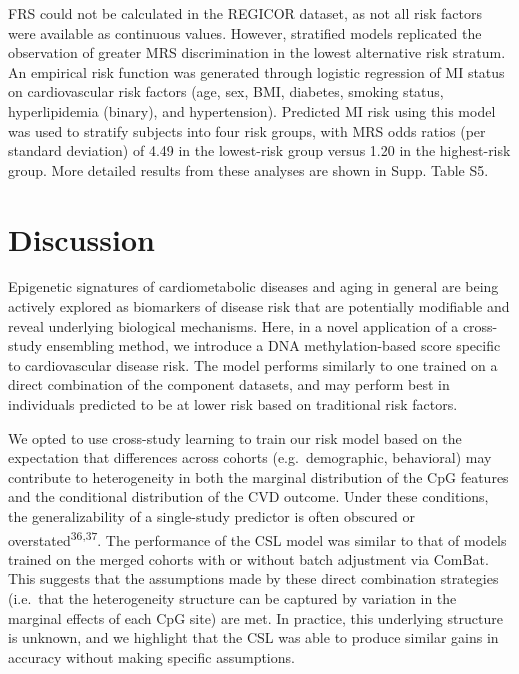 \documentclass[]{article}
\begin{document}
FRS could not be calculated in the REGICOR dataset, as not all risk
factors were available as continuous values. However, stratified models
replicated the observation of greater MRS discrimination in the lowest
alternative risk stratum. An empirical risk function was generated
through logistic regression of MI status on cardiovascular risk factors
(age, sex, BMI, diabetes, smoking status, hyperlipidemia (binary), and
hypertension). Predicted MI risk using this model was used to stratify
subjects into four risk groups, with MRS odds ratios (per standard
deviation) of 4.49 in the lowest-risk group versus 1.20 in the
highest-risk group. More detailed results from these analyses are shown
in Supp. Table S5.

\hypertarget{discussion}{%
\section{Discussion}\label{discussion}}

Epigenetic signatures of cardiometabolic diseases and aging in general
are being actively explored as biomarkers of disease risk that are
potentially modifiable and reveal underlying biological mechanisms.
Here, in a novel application of a cross-study ensembling method, we
introduce a DNA methylation-based score specific to cardiovascular
disease risk. The model performs similarly to one trained on a direct
combination of the component datasets, and may perform best in
individuals predicted to be at lower risk based on traditional risk
factors.

We opted to use cross-study learning to train our risk model based on
the expectation that differences across cohorts (e.g.~demographic,
behavioral) may contribute to heterogeneity in both the marginal
distribution of the CpG features and the conditional distribution of the
CVD outcome. Under these conditions, the generalizability of a
single-study predictor is often obscured or
overstated\textsuperscript{36,37}. The performance of the CSL model was
similar to that of models trained on the merged cohorts with or without
batch adjustment via ComBat. This suggests that the assumptions made by
these direct combination strategies (i.e.~that the heterogeneity
structure can be captured by variation in the marginal effects of each
CpG site) are met. In practice, this underlying structure is unknown,
and we highlight that the CSL was able to produce similar gains in
accuracy without making specific assumptions.
\end{document}
